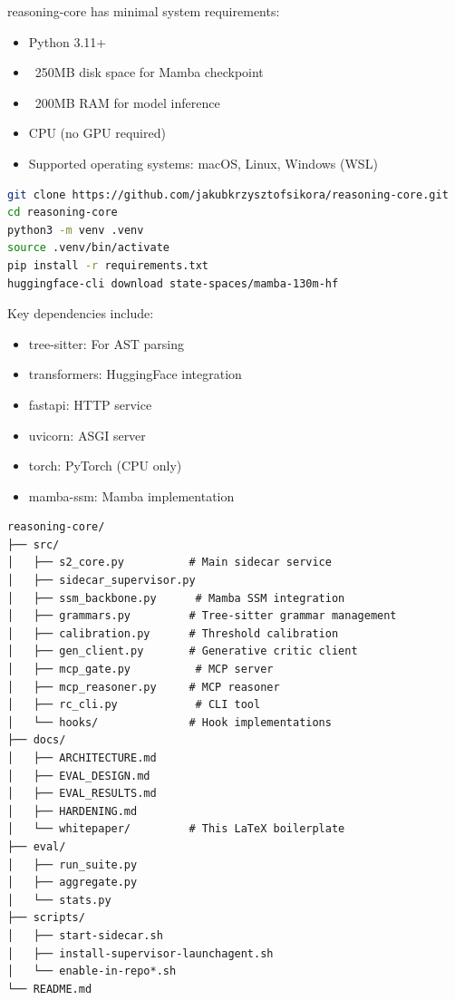 

reasoning-core has minimal system requirements:

\begin{itemize}
    \item Python 3.11+
    \item ~250MB disk space for Mamba checkpoint
    \item ~200MB RAM for model inference
    \item CPU (no GPU required)
    \item Supported operating systems: macOS, Linux, Windows (WSL)
\end{itemize}


\begin{lstlisting}[language=bash, caption={Installation Commands}]
git clone https://github.com/jakubkrzysztofsikora/reasoning-core.git
cd reasoning-core
python3 -m venv .venv
source .venv/bin/activate
pip install -r requirements.txt
huggingface-cli download state-spaces/mamba-130m-hf
\end{lstlisting}


Key dependencies include:

\begin{itemize}
    \item tree-sitter: For AST parsing
    \item transformers: HuggingFace integration
    \item fastapi: HTTP service
    \item uvicorn: ASGI server
    \item torch: PyTorch (CPU only)
    \item mamba-ssm: Mamba implementation
\end{itemize}


\begin{lstlisting}[language=text, caption={Project Directory Structure}]
reasoning-core/
├── src/
│   ├── s2_core.py          # Main sidecar service
│   ├── sidecar_supervisor.py
│   ├── ssm_backbone.py      # Mamba SSM integration
│   ├── grammars.py         # Tree-sitter grammar management
│   ├── calibration.py      # Threshold calibration
│   ├── gen_client.py       # Generative critic client
│   ├── mcp_gate.py          # MCP server
│   ├── mcp_reasoner.py     # MCP reasoner
│   ├── rc_cli.py            # CLI tool
│   └── hooks/              # Hook implementations
├── docs/
│   ├── ARCHITECTURE.md
│   ├── EVAL_DESIGN.md
│   ├── EVAL_RESULTS.md
│   ├── HARDENING.md
│   └── whitepaper/         # This LaTeX boilerplate
├── eval/
│   ├── run_suite.py
│   ├── aggregate.py
│   └── stats.py
├── scripts/
│   ├── start-sidecar.sh
│   ├── install-supervisor-launchagent.sh
│   └── enable-in-repo*.sh
└── README.md
\end{lstlisting}

